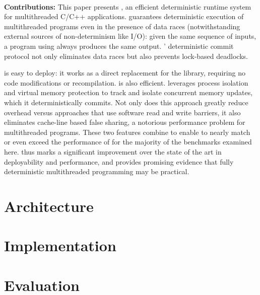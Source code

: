 \hspace{1em} \\
\noindent
\textbf{Contributions:}
This paper presents \textbf{\dthreads{}}, an efficient deterministic runtime
system for multithreaded C/C++ applications. \dthreads{} guarantees
deterministic execution of multithreaded programs even in the presence
of data races (notwithstanding external sources of non-determinism
like I/O): given the same sequence of inputs, a program
using \dthreads{} always produces the same output. \dthreads{}'
deterministic commit protocol not only eliminates data races but also
prevents lock-based deadlocks.

\dthreads{} is easy to deploy: it works as a direct replacement for
the \pthreads{} library, requiring no code modifications or
recompilation. \dthreads{} is also efficient. \dthreads{} leverages
process isolation and virtual memory protection to track and isolate
concurrent memory updates, which it deterministically commits. Not
only does this approach greatly reduce overhead versus approaches that
use software read and write barriers, it also eliminates cache-line
based false sharing, a notorious performance problem for multithreaded
programs. These two features combine to enable \dthreads{} to nearly
match or even exceed the performance of \pthreads{} for the majority
of the benchmarks examined here. \dthreads{} thus marks a significant
improvement over the state of the art in deployability and
performance, and provides promising evidence that fully deterministic
multithreaded programming may be practical.

\section{Architecture}


\section{Implementation}


\section{Evaluation}

